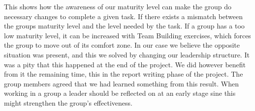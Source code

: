 This shows how the awareness of our maturity level can make the group do necessary changes to complete a given task. If there exists a mismatch between the groups maturity level and the level needed by the task. If a group has a too low maturity level, it can be increased with Team Building exercises, which forces the group to move out of its comfort zone. In our case we believe the opposite situation was present, and this we solved by changing our leadership structure. It was a pity that this happened at the end of the project. We did however benefit from it the remaining time, this in the report writing phase of the project. The group members agreed that we had learned something from this result. When working in a group a leader should be reflected on at an early stage sine this might strengthen the group’s effectiveness. 


